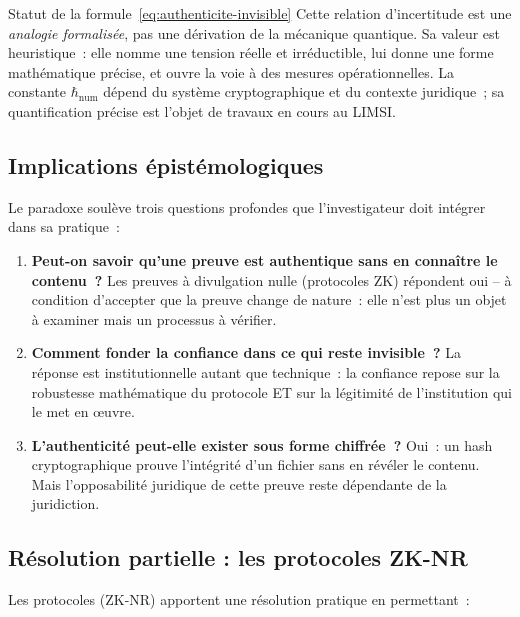\begin{boiteRemarque}{Statut de la formule~\eqref{eq:authenticite-invisible}}
Cette relation d'incertitude est une \emph{analogie formalisée}, pas une
dérivation de la mécanique quantique. Sa valeur est heuristique~: elle
nomme une tension réelle et irréductible, lui donne une forme mathématique
précise, et ouvre la voie à des mesures opérationnelles. La constante
$\hbar_{\mathrm{num}}$ dépend du système cryptographique et du contexte
juridique~; sa quantification précise est l'objet de travaux en cours
au LIMSI.
\end{boiteRemarque}

\subsection{Implications épistémologiques}

Le paradoxe soulève trois questions profondes que l'investigateur doit
intégrer dans sa pratique~:

\begin{enumerate}
    \item \textbf{Peut-on savoir qu'une preuve est authentique sans
          en connaître le contenu~?} Les preuves à divulgation nulle
          (protocoles ZK) répondent oui -- à condition d'accepter que
          la preuve change de nature~: elle n'est plus un objet à examiner
          mais un processus à vérifier.

    \item \textbf{Comment fonder la confiance dans ce qui reste invisible~?}
          La réponse est institutionnelle autant que technique~: la confiance
          repose sur la robustesse mathématique du protocole ET sur la
          légitimité de l'institution qui le met en œuvre.

    \item \textbf{L'authenticité peut-elle exister sous forme chiffrée~?}
          Oui~: un hash cryptographique prouve l'intégrité d'un fichier
          sans en révéler le contenu. Mais l'opposabilité juridique de
          cette preuve reste dépendante de la juridiction.
\end{enumerate}

\subsection{Résolution partielle : les protocoles ZK-NR}

Les protocoles  (ZK-NR)
\cite{minka2025zknr} apportent une résolution pratique en permettant~:

